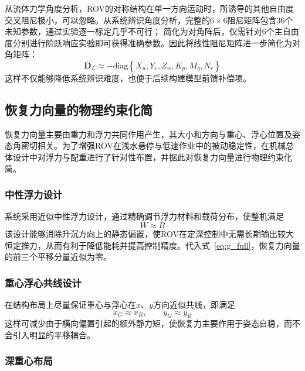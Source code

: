 
从流体力学角度分析，ROV的对称结构在单一方向运动时，所诱导的其他自由度交叉阻尼极小，可以忽略。从系统辨识角度分析，完整的$6\times6$阻尼矩阵包含36个未知参数，通过实验逐一标定几乎不可行；
简化为对角阵后，仅需针对6个主自由度分别进行阶跃响应实验即可获得准确参数。因此将线性阻尼矩阵进一步简化为对角矩阵：
\begin{equation}
    \boldsymbol{D}_{L}\approx
    -\mathrm{diag}
    \left\{
        X_{u},Y_{v},Z_{w},K_{p},M_{q},N_{r}
    \right\}
    \label{eq:D_simplified}
\end{equation}
这样不仅能够降低系统辨识难度，也便于后续构建模型前馈补偿项。

\subsection{恢复力向量的物理约束化简}

恢复力向量主要由重力和浮力共同作用产生，其大小和方向与重心、浮心位置及姿态角密切相关。为了增强ROV在浅水悬停与低速作业中的被动稳定性，在机械总体设计中对浮力与配重进行了针对性布置，并据此对恢复力向量进行物理约束化简。

\subsubsection{中性浮力设计}

系统采用近似中性浮力设计，通过精确调节浮力材料和载荷分布，使整机满足
\begin{equation}
    W \approx B
\end{equation}
该设计能够消除升沉方向上的静态偏置，使ROV在定深控制中无需长期输出较大恒定推力，从而有利于降低能耗并提高控制精度。代入式~\eqref{eq:g_full}，恢复力向量的前三个平移分量近似为零。

\subsubsection{重心浮心共线设计}

在结构布局上尽量保证重心与浮心在$x$、$y$方向近似共线，即满足
\begin{equation}
    x_G \approx x_B,\qquad y_G \approx y_B
\end{equation}
这样可减少由于横向偏置引起的额外静力矩，使恢复力主要作用于姿态自稳，而不会引入明显的平移耦合。

\subsubsection{深重心布局}

